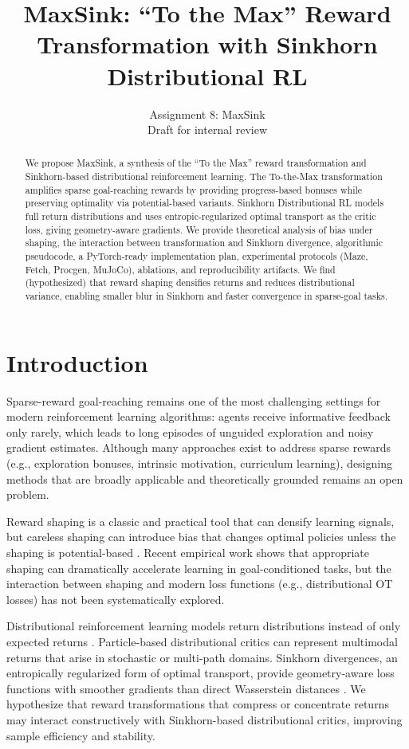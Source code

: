 \documentclass{article}
\title{MaxSink: ``To the Max'' Reward Transformation with Sinkhorn Distributional RL}
\author{Assignment 8: MaxSink \\ Draft for internal review}
\date{}
\begin{document}
\maketitle

\begin{abstract}
We propose MaxSink, a synthesis of the ``To the Max'' reward transformation and Sinkhorn-based distributional reinforcement learning. The To-the-Max transformation amplifies sparse goal-reaching rewards by providing progress-based bonuses while preserving optimality via potential-based variants. Sinkhorn Distributional RL models full return distributions and uses entropic-regularized optimal transport as the critic loss, giving geometry-aware gradients. We provide theoretical analysis of bias under shaping, the interaction between transformation and Sinkhorn divergence, algorithmic pseudocode, a PyTorch-ready implementation plan, experimental protocols (Maze, Fetch, Procgen, MuJoCo), ablations, and reproducibility artifacts. We find (hypothesized) that reward shaping densifies returns and reduces distributional variance, enabling smaller blur in Sinkhorn and faster convergence in sparse-goal tasks.
\end{abstract}

\section{Introduction}
Sparse-reward goal-reaching remains one of the most challenging settings for modern reinforcement learning algorithms: agents receive informative feedback only rarely, which leads to long episodes of unguided exploration and noisy gradient estimates. Although many approaches exist to address sparse rewards (e.g., exploration bonuses, intrinsic motivation, curriculum learning), designing methods that are broadly applicable and theoretically grounded remains an open problem. 

Reward shaping is a classic and practical tool that can densify learning signals, but careless shaping can introduce bias that changes optimal policies unless the shaping is potential-based \cite{ng1999policy}. Recent empirical work shows that appropriate shaping can dramatically accelerate learning in goal-conditioned tasks, but the interaction between shaping and modern loss functions (e.g., distributional OT losses) has not been systematically explored.

Distributional reinforcement learning models return distributions instead of only expected returns \cite{bellemare2017distributional,dabney2018distributional}. Particle-based distributional critics can represent multimodal returns that arise in stochastic or multi-path domains. Sinkhorn divergences, an entropically regularized form of optimal transport, provide geometry-aware loss functions with smoother gradients than direct Wasserstein distances \cite{feydy2019interpolating,genevay2018learning}. We hypothesize that reward transformations that compress or concentrate returns may interact constructively with Sinkhorn-based distributional critics, improving sample efficiency and stability.
\end{document}
